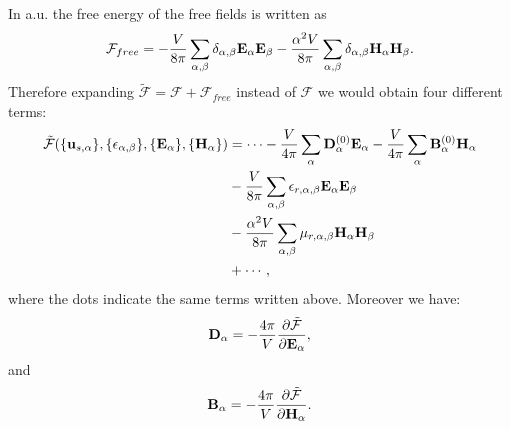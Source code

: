 \documentclass[12pt,a4paper,twoside]{report}
\begin{document}
{\color{web-blue} In a.u. the free energy of the 
free fields is written as
\begin{equation}
\mathcal{F}_{free}=-{V \over 8 \pi} \sum_{\alpha,\beta} 
\delta_{\alpha,\beta} {\bf E}_\alpha {\bf E}_\beta-
{\alpha^2 V \over 8 \pi} \sum_{\alpha,\beta} 
\delta_{\alpha,\beta} {\bf H}_\alpha {\bf H}_\beta.
\end{equation}
Therefore expanding $\mathcal{\tilde F} = \mathcal{F} + \mathcal{F}_{free}$
instead of $\mathcal{F}$ we would obtain four different terms:
\begin{align}
\mathcal{\tilde F}(\{{\bf u}_{s,\alpha}\}, \{\epsilon_{\alpha,\beta}\},
\{ {\bf E}_\alpha\}, \{{\bf H}_\alpha\})&= \cdots -
{V \over 4 \pi} \sum_{\alpha} {\bf D}^{(0)}_\alpha {\bf E}_\alpha - 
{V \over 4 \pi} \sum_{\alpha} {\bf B}^{(0)}_\alpha {\bf H}_\alpha \nonumber \\
&- {V\over 8 \pi} \sum_{\alpha,\beta} 
\epsilon_{r,\alpha,\beta}
{\bf E}_{\alpha}
{\bf E}_{\beta} \nonumber \\
&- {\alpha^2 V\over 8 \pi} \sum_{\alpha,\beta} 
\mu_{r,\alpha,\beta}
{\bf H}_{\alpha}
{\bf H}_{\beta} \nonumber \\
&+ \cdots,
\end{align}
where the dots indicate the same terms written above.
Moreover we have:
\begin{equation}
{\bf D}_\alpha = -{4\pi\over V} {\partial \mathcal{\tilde F} \over 
\partial {\bf E}_\alpha},
\end{equation}
and
\begin{equation}
{\bf B}_\alpha = -{4\pi\over V} {\partial \mathcal{\tilde F} \over 
\partial {\bf H}_\alpha}.
\end{equation}
}
\\
\end{document}
